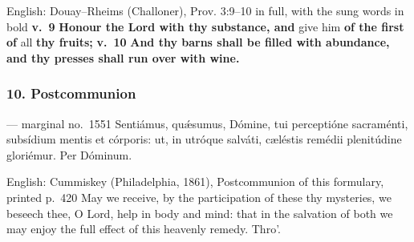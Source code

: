 \begin{namedtranslation}{English: Douay--Rheims (Challoner), Prov. 3:9--10 in full, with the sung words in bold}
\textbf{v.~9} \textbf{Honour the Lord with thy substance, and} give him
\textbf{of the first of} all \textbf{thy fruits;} \textbf{v.~10} \textbf{And
thy barns shall be filled with abundance, and thy presses shall run over with
wine.}
\end{namedtranslation}


\elementguard
\subsubsection*{10. Postcommunion }

\begin{appointedlatin}{ --- marginal no.\ 1551}
Sentiámus, quǽsumus, Dómine, tui perceptióne sacraménti, subsídium mentis et
córporis: ut, in utróque salváti, cæléstis remédii plenitúdine gloriémur. Per
Dóminum.
\end{appointedlatin}

\begin{namedtranslation}{English: Cummiskey (Philadelphia, 1861), Postcommunion of this formulary, printed p.~420}
May we receive, by the participation of these thy mysteries, we beseech thee,
O Lord, help in body and mind: that in the salvation of both we may enjoy the
full effect of this heavenly remedy. Thro'.
\end{namedtranslation}


\clearpage
